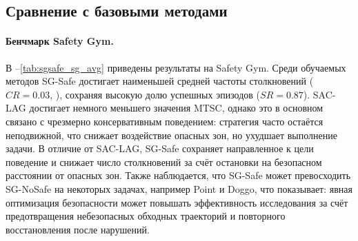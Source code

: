 \subsection{Сравнение с базовыми методами}
\label{subsec:sgsafe_rq3}

\paragraph{Бенчмарк Safety Gym.}
В --\ref{tab:sgsafe_sg_avg} приведены результаты на Safety Gym. Среди обучаемых методов SG-Safe достигает наименьшей средней частоты столкновений ($CR=0.03$, ), сохраняя высокую долю успешных эпизодов ($SR=0.87$). SAC-LAG достигает немного меньшего значения MTSC, однако это в основном связано с чрезмерно консервативным поведением: стратегия часто остаётся неподвижной, что снижает воздействие опасных зон, но ухудшает выполнение задачи. В отличие от SAC-LAG, SG-Safe сохраняет направленное к цели поведение и снижает число столкновений за счёт остановки на безопасном расстоянии от опасных зон. Также наблюдается, что SG-Safe может превосходить SG-NoSafe на некоторых задачах, например Point и Doggo, что показывает: явная оптимизация безопасности может повышать эффективность исследования за счёт предотвращения небезопасных обходных траекторий и повторного восстановления после нарушений.

